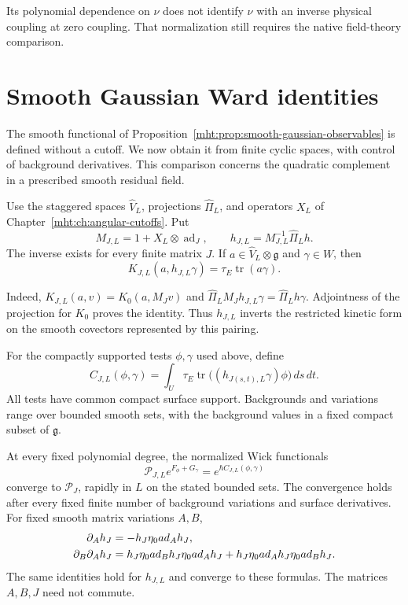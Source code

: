 Its polynomial dependence on $\nu$ does not identify $\nu$ with
an inverse physical coupling at zero coupling. That normalization
still requires the native field-theory comparison.

\section{Smooth Gaussian Ward identities}

The smooth functional of
Proposition~\ref{mht:prop:smooth-gaussian-observables} is defined
without a cutoff. We now obtain it from finite cyclic spaces, with
control of background derivatives. This comparison concerns the
quadratic complement in a prescribed smooth residual field.

Use the staggered spaces $\widehat V_L$, projections
$\widehat\Pi_L$, and operators $X_L$ of
Chapter~\ref{mht:ch:angular-cutoffs}. Put
\[
 M_{J,L}=1+X_L\otimes\operatorname{ad}_J,\qquad
 h_{J,L}=M_{J,L}^{-1}\widehat\Pi_Lh.
\]
The inverse exists for every finite matrix $J$. If
$a\in\widehat V_L\otimes\mathfrak g$ and
$\gamma\in W$, then
\begin{equation}\label{mht:eq:staggered-pairing-inverse}
 K_{J,L}(a,h_{J,L}\gamma)=\tau_E\operatorname{tr}(a\gamma).
\end{equation}

Indeed, $K_{J,L}(a,v)=K_0(a,M_Jv)$ and
$\widehat\Pi_LM_Jh_{J,L}\gamma=\widehat\Pi_Lh\gamma$.
Adjointness of the projection for $K_0$ proves the identity.
Thus $h_{J,L}$ inverts the restricted kinetic form on the smooth
covectors represented by this pairing.

For the compactly supported tests $\phi,\gamma$ used above, define
\[
 C_{J,L}(\phi,\gamma)=\int_U\tau_E\operatorname{tr}
                  \bigl((h_{J(s,t),L}\gamma)\phi\bigr)\,ds\,dt.
\]
All tests have common compact surface support. Backgrounds and
variations range over bounded smooth sets, with the background
values in a fixed compact subset of $\mathfrak g$.

\begin{theorem}\label{mht:thm:smooth-ward-limit}
At every fixed polynomial degree, the normalized Wick functionals
\[
 \mathcal P_{J,L}e^{F_\phi+G_\gamma}
       =e^{\hbar C_{J,L}(\phi,\gamma)}
\]
converge to $\mathcal P_J$, rapidly in $L$ on the stated bounded
sets. The convergence holds after every fixed finite number of
background variations and surface derivatives.
For fixed smooth matrix variations $A,B$,
\begin{align}
 \partial_Ah_J&=-h_J\eta_0\operatorname{ad}_A h_J,\notag\\
 \partial_B\partial_Ah_J
   &=h_J\eta_0\operatorname{ad}_B h_J\eta_0\operatorname{ad}_A h_J
     +h_J\eta_0\operatorname{ad}_A h_J\eta_0\operatorname{ad}_B h_J.
 \label{mht:eq:ordered-smooth-responses}
\end{align}
The same identities hold for $h_{J,L}$ and converge to these
formulas. The matrices $A,B,J$ need not commute.
\end{theorem}

